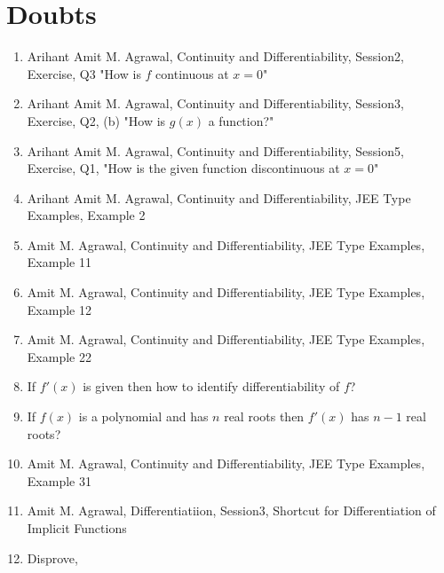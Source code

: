 \documentclass{article}
\title{}
\author{}
\date{}
\begin{document}
\maketitle

\section{Doubts}
\begin{enumerate}
    \item Arihant Amit M. Agrawal, Continuity and Differentiability, Session2, Exercise, Q3 "How is $f$ continuous at $x=0$"
    \item Arihant Amit M. Agrawal, Continuity and Differentiability, Session3, Exercise, Q2, (b) "How is $g(x)$ a function?"
    \item Arihant Amit M. Agrawal, Continuity and Differentiability, Session5, Exercise, Q1, "How is the given function discontinuous at $x=0$"
    \item Arihant Amit M. Agrawal, Continuity and Differentiability, JEE Type Examples, Example 2
    \item Amit M. Agrawal, Continuity and Differentiability, JEE Type Examples, Example 11
    \item Amit M. Agrawal, Continuity and Differentiability, JEE Type Examples, Example 12
    \item Amit M. Agrawal, Continuity and Differentiability, JEE Type Examples, Example 22
    \item If $f'(x)$ is given then how to identify differentiability of $f$?
    \item If $f(x)$ is a polynomial and has $n$ real roots then $f'(x)$ has $n-1$ real roots?
    \item Amit M. Agrawal, Continuity and Differentiability, JEE Type Examples, Example 31
    \item Amit M. Agrawal, Differentiatiion, Session3, Shortcut for Differentiation of Implicit Functions
    \item Disprove,


\end{enumerate}
\end{document}
